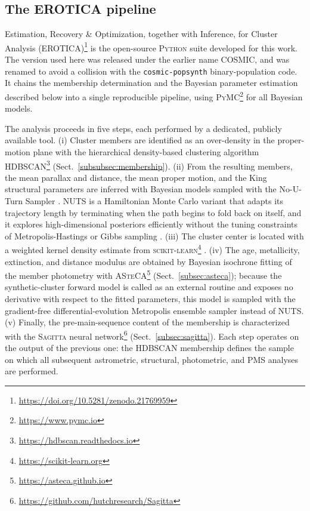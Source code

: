 \documentclass{aa}
\begin{document}
\subsection{The \textsc{EROTICA} pipeline}\label{subsec:cosmic}
Estimation, Recovery \& Optimization, together with Inference, for Cluster Analysis (\textsc{EROTICA})\footnote{\url{https://doi.org/10.5281/zenodo.21769959}} is the open-source \textsc{Python} suite developed for this work. The version used here was released under the earlier name \textsc{COSMIC}, and was renamed to avoid a collision with the \texttt{cosmic-popsynth} binary-population code. It chains the membership determination and the Bayesian parameter estimation described below into a single reproducible pipeline, using \textsc{PyMC}\footnote{\url{https://www.pymc.io}} \citep{pymc2023} for all Bayesian models.

The analysis proceeds in five steps, each performed by a dedicated, publicly available tool. (i) Cluster members are identified as an over-density in the proper-motion plane with the hierarchical density-based clustering algorithm \textsc{HDBSCAN}\footnote{\url{https://hdbscan.readthedocs.io}} \citep{10.1007/978-3-642-37456-2_14,McInnes2017} (Sect.~\ref{subsubsec:membership}). (ii) From the resulting members, the mean parallax and distance, the mean proper motion, and the King structural parameters are inferred with Bayesian models sampled with the No-U-Turn Sampler \citep[NUTS;][]{2014JMLR...15.1593H}. NUTS is a Hamiltonian Monte Carlo variant that adapts its trajectory length by terminating when the path begins to fold back on itself, and it explores high-dimensional posteriors efficiently without the tuning constraints of Metropolis-Hastings or Gibbs sampling \citep{pymc2023}. (iii) The cluster center is located with a weighted kernel density estimate from \textsc{scikit-learn}\footnote{\url{https://scikit-learn.org}} \citep{scikit-learn}. (iv) The age, metallicity, extinction, and distance modulus are obtained by Bayesian isochrone fitting of the member photometry with \textsc{ASteCA}\footnote{\url{https://asteca.github.io}} \citep{2015A&A...576A...6P} (Sect.~\ref{subsec:asteca}); because the synthetic-cluster forward model is called as an external routine and exposes no derivative with respect to the fitted parameters, this model is sampled with the gradient-free differential-evolution Metropolis ensemble sampler \citep[DEMetropolis;][]{2006S&C....16..239T} instead of NUTS\@. (v) Finally, the pre-main-sequence content of the membership is characterized with the \textsc{Sagitta} neural network\footnote{\url{https://github.com/hutchresearch/Sagitta}} \citep{2021AJ....162..282M} (Sect.~\ref{subsec:sagitta}). Each step operates on the output of the previous one: the \textsc{HDBSCAN} membership defines the sample on which all subsequent astrometric, structural, photometric, and PMS analyses are performed.  %
\end{document}
